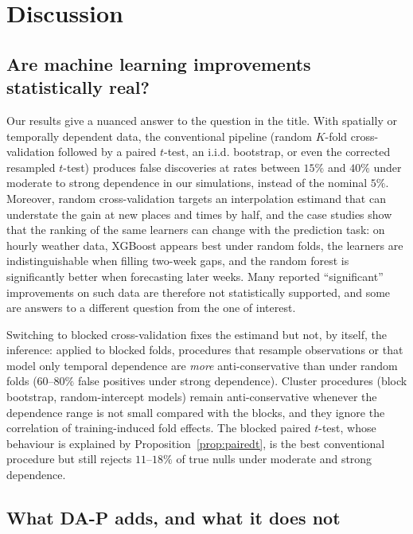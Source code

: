 \section{Discussion}\label{sec:discussion}

\subsection{Are machine learning improvements statistically real?}

Our results give a nuanced answer to the question in the title. With spatially or temporally dependent data, the conventional pipeline (random $K$-fold cross-validation followed by a paired $t$-test, an i.i.d. bootstrap, or even the corrected resampled $t$-test) produces false discoveries at rates between $15\%$ and $40\%$ under moderate to strong dependence in our simulations, instead of the nominal $5\%$. Moreover, random cross-validation targets an interpolation estimand that can understate the gain at new places and times by half, and the case studies show that the ranking of the same learners can change with the prediction task: on hourly weather data, XGBoost appears best under random folds, the learners are indistinguishable when filling two-week gaps, and the random forest is significantly better when forecasting later weeks. Many reported ``significant'' improvements on such data are therefore not statistically supported, and some are answers to a different question from the one of interest.

Switching to blocked cross-validation fixes the estimand but not, by itself, the inference: applied to blocked folds, procedures that resample observations or that model only temporal dependence are \emph{more} anti-conservative than under random folds ($60$--$80\%$ false positives under strong dependence). Cluster procedures (block bootstrap, random-intercept models) remain anti-conservative whenever the dependence range is not small compared with the blocks, and they ignore the correlation of training-induced fold effects. The blocked paired $t$-test, whose behaviour is explained by Proposition~\ref{prop:pairedt}, is the best conventional procedure but still rejects $11$--$18\%$ of true nulls under moderate and strong dependence.

\subsection{What DA-P adds, and what it does not}

